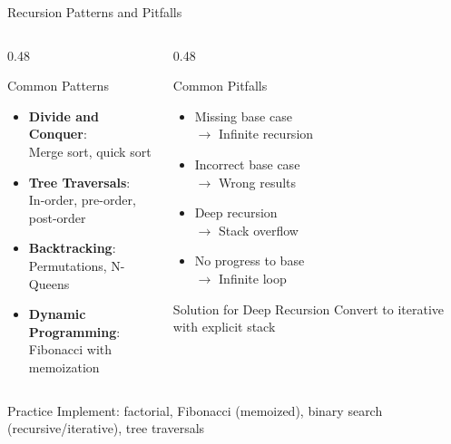 \documentclass[aspectratio=169,xcolor=dvipsnames]{beamer}
\begin{document}
\begin{frame}{Recursion Patterns and Pitfalls}
  \begin{columns}
    \begin{column}{0.48\textwidth}
      \begin{block}{Common Patterns}
        \begin{itemize}
          \item \textbf{Divide and Conquer}: \\
                Merge sort, quick sort
          \item \textbf{Tree Traversals}: \\
                In-order, pre-order, post-order
          \item \textbf{Backtracking}: \\
                Permutations, N-Queens
          \item \textbf{Dynamic Programming}: \\
                Fibonacci with memoization
        \end{itemize}
      \end{block}
    \end{column}
    \begin{column}{0.48\textwidth}
      \begin{alertblock}{Common Pitfalls}
        \begin{itemize}
          \item Missing base case \\
                $\rightarrow$ Infinite recursion
          \item Incorrect base case \\
                $\rightarrow$ Wrong results
          \item Deep recursion \\
                $\rightarrow$ Stack overflow
          \item No progress to base \\
                $\rightarrow$ Infinite loop
        \end{itemize}
      \end{alertblock}

      \vspace{0.2cm}

      \begin{block}{Solution for Deep Recursion}
        Convert to iterative with explicit stack
      \end{block}
    \end{column}
  \end{columns}

  \vspace{0.3cm}

  \begin{exampleblock}{Practice}
    Implement: factorial, Fibonacci (memoized), binary search (recursive/iterative), tree traversals
  \end{exampleblock}
\end{frame}
\end{document}
